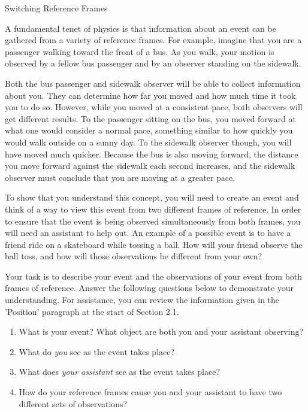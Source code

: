 \documentclass[
]{book}
\providecommand{\tightlist}{%
  \setlength{\itemsep}{0pt}\setlength{\parskip}{0pt}}
\newenvironment{note}{}{}
\begin{document}
\hypertarget{fs-id2066209}{}
\begin{note}

Switching Reference Frames

A fundamental tenet of physics is that information about an event can be
gathered from a variety of reference frames. For example, imagine that
you are a passenger walking toward the front of a bus. As you walk, your
motion is observed by a fellow bus passenger and by an observer standing
on the sidewalk.

Both the bus passenger and sidewalk observer will be able to collect
information about you. They can determine how far you moved and how much
time it took you to do so. However, while you moved at a consistent
pace, both observers will get different results. To the passenger
sitting on the bus, you moved forward at what one would consider a
normal pace, something similar to how quickly you would walk outside on
a sunny day. To the sidewalk observer though, you will have moved much
quicker. Because the bus is also moving forward, the distance you move
forward against the sidewalk each second increases, and the sidewalk
observer must conclude that you are moving at a greater pace.

To show that you understand this concept, you will need to create an
event and think of a way to view this event from two different frames of
reference. In order to ensure that the event is being observed
simultaneously from both frames, you will need an assistant to help out.
An example of a possible event is to have a friend ride on a skateboard
while tossing a ball. How will your friend observe the ball toss, and
how will those observations be different from your own?

Your task is to describe your event and the observations of your event
from both frames of reference. Answer the following questions below to
demonstrate your understanding. For assistance, you can review the
information given in the 'Position' paragraph at the start of Section
2.1.

\begin{enumerate}
\def\labelenumi{\arabic{enumi}.}
\tightlist
\item
  What is your event? What object are both you and your assistant
  observing?
\item
  What do \emph{you} see as the event takes place?
\item
  What does \emph{your assistant} see as the event takes place?
\item
  How do your reference frames cause you and your assistant to have
  two different sets of observations?
\end{enumerate}

\end{note}
\end{document}
